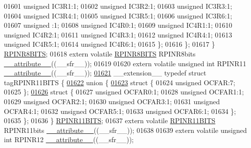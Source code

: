 \begin{DoxyCode}
01601       \textcolor{keywordtype}{unsigned} IC3R1:1;
01602       \textcolor{keywordtype}{unsigned} IC3R2:1;
01603       \textcolor{keywordtype}{unsigned} IC3R3:1;
01604       \textcolor{keywordtype}{unsigned} IC3R4:1;
01605       \textcolor{keywordtype}{unsigned} IC3R5:1;
01606       \textcolor{keywordtype}{unsigned} IC3R6:1;
01607       \textcolor{keywordtype}{unsigned} :1;
01608       \textcolor{keywordtype}{unsigned} IC4R0:1;
01609       \textcolor{keywordtype}{unsigned} IC4R1:1;
01610       \textcolor{keywordtype}{unsigned} IC4R2:1;
01611       \textcolor{keywordtype}{unsigned} IC4R3:1;
01612       \textcolor{keywordtype}{unsigned} IC4R4:1;
01613       \textcolor{keywordtype}{unsigned} IC4R5:1;
01614       \textcolor{keywordtype}{unsigned} IC4R6:1;
01615     \};
01616   \};
01617 \} \hyperlink{a00014_d4/d8f/a00742}{RPINR8BITS};
01618 \textcolor{keyword}{extern} \textcolor{keyword}{volatile} \hyperlink{a00014_d4/d8f/a00742}{RPINR8BITS} RPINR8bits \hyperlink{a00015_a493c46f03454991ccc5aa7a6e1dfb2a7}{\_\_attribute\_\_}((\_\_sfr\_\_));
01619 
01620 \textcolor{keyword}{extern} \textcolor{keyword}{volatile} \textcolor{keywordtype}{unsigned} \textcolor{keywordtype}{int}  RPINR11 \hyperlink{a00015_a493c46f03454991ccc5aa7a6e1dfb2a7}{\_\_attribute\_\_}((\_\_sfr\_\_));
\hypertarget{a00015_source_l01621}{}\hyperlink{a00014}{01621} \_\_extension\_\_ \textcolor{keyword}{typedef} \textcolor{keyword}{struct }tagRPINR11BITS \{
\hypertarget{a00015_source_l01622}{}\hyperlink{a00015}{01622}   \textcolor{keyword}{union }\{
\hypertarget{a00015_source_l01623}{}\hyperlink{a00015}{01623}     \textcolor{keyword}{struct }\{
01624       \textcolor{keywordtype}{unsigned} OCFAR:7;
01625     \};
\hypertarget{a00015_source_l01626}{}\hyperlink{a00015}{01626}     \textcolor{keyword}{struct }\{
01627       \textcolor{keywordtype}{unsigned} OCFAR0:1;
01628       \textcolor{keywordtype}{unsigned} OCFAR1:1;
01629       \textcolor{keywordtype}{unsigned} OCFAR2:1;
01630       \textcolor{keywordtype}{unsigned} OCFAR3:1;
01631       \textcolor{keywordtype}{unsigned} OCFAR4:1;
01632       \textcolor{keywordtype}{unsigned} OCFAR5:1;
01633       \textcolor{keywordtype}{unsigned} OCFAR6:1;
01634     \};
01635   \};
01636 \} \hyperlink{a00014_d2/d74/a00697}{RPINR11BITS};
01637 \textcolor{keyword}{extern} \textcolor{keyword}{volatile} \hyperlink{a00014_d2/d74/a00697}{RPINR11BITS} RPINR11bits \hyperlink{a00015_a493c46f03454991ccc5aa7a6e1dfb2a7}{\_\_attribute\_\_}((\_\_sfr\_\_));
01638 
01639 \textcolor{keyword}{extern} \textcolor{keyword}{volatile} \textcolor{keywordtype}{unsigned} \textcolor{keywordtype}{int}  RPINR12 \hyperlink{a00015_a493c46f03454991ccc5aa7a6e1dfb2a7}{\_\_attribute\_\_}((\_\_sfr\_\_));

\end{DoxyCode}
